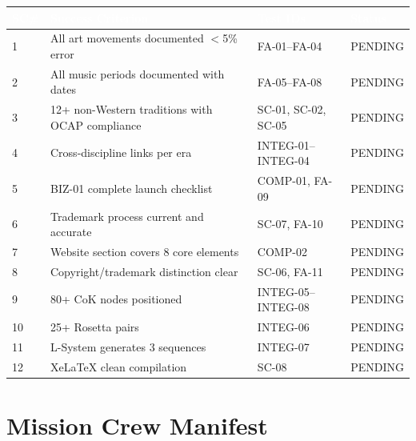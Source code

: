 \documentclass[11pt,letterpaper]{article}
\newcommand{\tableheader}[1]{\textbf{\sffamily\textcolor{white}{#1}}}
\begin{document}
\begin{tabularx}{\textwidth}{C{1cm}L{5cm}L{4cm}C{2cm}}
\toprule
{}
\tableheader{SC\#} & \tableheader{Success Criterion} & \tableheader{Test IDs} & \tableheader{Status} \\
 & All art movements documented $<$5\% error & FA-01--FA-04 & PENDING \\
2 & All music periods documented with dates & FA-05--FA-08 & PENDING \\
3 & 12+ non-Western traditions with OCAP compliance & SC-01, SC-02, SC-05 & PENDING \\
4 & Cross-discipline links per era & INTEG-01--INTEG-04 & PENDING \\
5 & BIZ-01 complete launch checklist & COMP-01, FA-09 & PENDING \\
6 & Trademark process current and accurate & SC-07, FA-10 & PENDING \\
7 & Website section covers 8 core elements & COMP-02 & PENDING \\
8 & Copyright/trademark distinction clear & SC-06, FA-11 & PENDING \\
9 & 80+ CoK nodes positioned & INTEG-05--INTEG-08 & PENDING \\
10 & 25+ Rosetta pairs & INTEG-06 & PENDING \\
11 & L-System generates 3 sequences & INTEG-07 & PENDING \\
12 & XeLaTeX clean compilation & SC-08 & PENDING \\
\bottomrule
\end{tabularx}

\section{Mission Crew Manifest}
\end{document}
